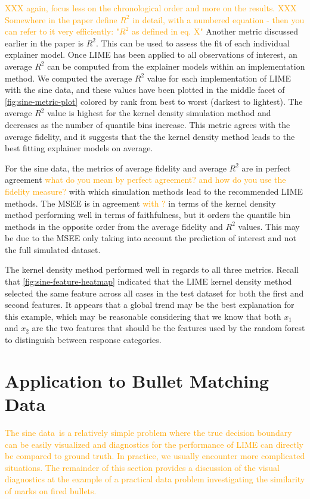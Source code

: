 \documentclass[AMS,STIX2COL]{WileyNJD-v2}\usepackage[]{graphicx}\usepackage[]{color}
\newcommand{\hh}[1]{\textcolor{orange}{#1}}
\newcommand{\data}{sine data}
\begin{document}
{\hh{XXX again, focus less on the chronological order and more on the results. }
\hh{XXX Somewhere in the paper define $R^2$ in detail, with a numbered equation - then you can refer to it very efficiently: "$R^2$ as defined in eq. X"  }
Another metric discussed earlier in the paper is $R^2$. This can be used to assess the fit of each individual explainer model. Once LIME has been applied to all observations of interest, an average $R^2$ can be computed from the explainer models within an implementation method. We computed the average $R^2$ value for each implementation of LIME with the \data, and these values have been plotted in the middle facet of \autoref{fig:sine-metric-plot} colored by rank from best to worst (darkest to lightest). The average $R^2$ value is highest for the kernel density simulation method and decreases as the number of quantile bins increase. This metric agrees with the average fidelity, and it suggests that the the kernel density method leads to the best fitting explainer models on average.

For the \data, the metrics of average fidelity and average $R^2$ are in perfect agreement \hh{what do you mean by perfect agreement? and how do you use the fidelity measure?} with which simulation methods lead to the recommended LIME methods. The MSEE is in agreement \hh{with ? } in terms of the kernel density method performing well in terms of faithfulness, but it orders the quantile bin methods in the opposite order from the average fidelity and $R^2$ values. This may be due to the MSEE only taking into account the prediction of interest and not the full simulated dataset.

The kernel density method performed well in regards to all three metrics. Recall that \autoref{fig:sine-feature-heatmap} indicated that the LIME kernel density method selected the same feature across all cases in the test dataset for both the first and second features. It appears that a global trend may be the best explanation for this example, which may be reasonable considering that we know that both $x_1$ and $x_2$ are the two features that should be the features used by the random forest to distinguish between response categories.

\section{Application to Bullet Matching Data} \label{application}

\hh{The \data \ is a relatively simple problem where the true decision boundary can be easily visualized and diagnostics for the performance of LIME can directly be compared to ground truth.}
\hh{In practice, we usually encounter more complicated situations. The remainder of this section provides a discussion of the visual diagnostics at the example of a practical data problem investigating the similarity of marks on fired bullets.}

}
\end{document}
